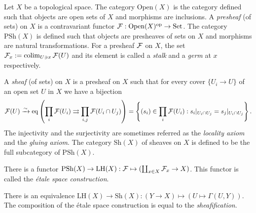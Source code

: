 \documentclass{../../large}
\begin{document}
\begin{prb}[Sheaves]
Let $X$ be a topological space.
The category $\mathrm{Open}(X)$ is the category defined such that objects are open sets of $X$ and morphisms are inclusions.
A \emph{presheaf} (of sets) on $X$ is a contravariant functor $\mathcal{F}:\mathrm{Open}(X)^{\mathrm{op}}\to\mathrm{Set}$.
The category $\mathrm{PSh}(X)$ is defined such that objects are presheaves of sets on $X$ and morphisms are natural transformations.
For a presheaf $\mathcal{F}$ on $X$, the set $\mathcal{F}_x:=\operatorname*{colim}_{U\ni x}\mathcal{F}(U)$ and its element is called a \emph{stalk} and a \emph{germ} at $x$ respectively.

A \emph{sheaf} (of sets) on $X$ is a presheaf on $X$ such that for every cover $\{U_i\to U\}$ of an open set $U$ in $X$ we have a bijection
\[\mathcal{F}(U)\xrightarrow{\sim}\mathrm{eq}\left(\prod_i\mathcal{F}(U_i)\rightrightarrows\prod_{i,j}\mathcal{F}(U_i\cap U_j)\right)=\left\{(s_i)\in\prod_i\mathcal{F}(U_i):s_i|_{U_i\cap U_j}=s_j|_{U_i\cap U_j}\right\}.\]
The injectivity and the surjectivity are sometimes referred as the \emph{locality axiom} and the \emph{gluing axiom}.
The category $\mathrm{Sh}(X)$ of sheaves on $X$ is defined to be the full subcategory of $\mathrm{PSh}(X)$.
\begin{parts}
\item There is a functor $\mathrm{PSh}(X)\to\mathrm{LH}(X):\mathcal{F}\mapsto(\coprod_{x\in X}\mathcal{F}_x\to X)$. This functor is called the \emph{\'etale space construction}.
\item There is an equivalence $\mathrm{LH}(X)\to\mathrm{Sh}(X):(Y\to X)\mapsto(U\mapsto\Gamma(U,Y))$. The composition of the \'etale space construction is equal to the \emph{sheafification}.
\end{parts}
\end{prb}
\end{document}
